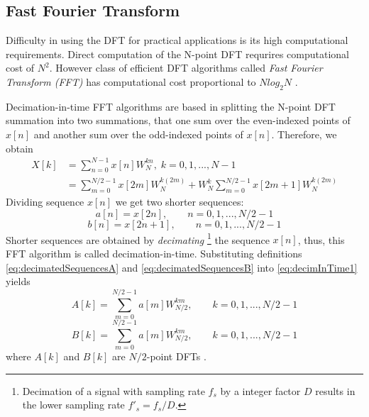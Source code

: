 \documentclass[twoside]{ctuthesis}
\theoremstyle{plain}
\theoremstyle{definition}
\theoremstyle{note}
\begin{document}
\subsection{Fast Fourier Transform}
\label{sec:FFT}
Difficulty in using the DFT for practical applications is its high computational requirements. Direct computation of the N-point DFT requrires computational cost of $N^2$. However class of efficient DFT algorithms called \textit{Fast Fourier Transform (FFT)} has computational cost proportional to $Nlog_{2}N$ \cite{cite:RT_DSP,cite:3}.
\par 
Decimation-in-time FFT algorithms are based in splitting the N-point DFT summation into two summations, that one sum over the even-indexed points of $x[n]$ and another sum over the odd-indexed points of $x[n]$.
Therefore, we obtain
\begin{equation} \label{eq:decimInTime1}
\begin{aligned}
X[k] &= \sum_{n=0}^{N-1}x[n]W^{kn}_{N}, \; k=0,1,...,N-1\\
     &= \sum_{m=0}^{N/2-1}x[2m]W^{k(2m)}_{N} + W^{k}_{N}\sum_{m=0}^{N/2-1}x[2m+1]W^{k(2m)}_{N}
     \end{aligned}
\end{equation}
Dividing sequence $x[n]$ we get two shorter sequences:
\begin{equation} \label{eq:decimatedSequencesA}
a[n]=x[2n],\qquad n=0, 1, ..., N/2 -1
\end{equation}
\begin{equation} \label{eq:decimatedSequencesB}
b[n]=x[2n+1],\qquad n=0, 1, ..., N/2 -1
\end{equation}
Shorter sequences are obtained by \textit{decimating}
\footnote{Decimation of a signal with sampling rate $f_{s}$ by a integer factor $D$ results in the lower sampling rate $f'_{s}=f_{s}/D$.}
 the sequence $x[n]$, thus, this FFT algorithm is called decimation-in-time.
Substituting definitions \ref{eq:decimatedSequencesA} and \ref{eq:decimatedSequencesB} into \ref{eq:decimInTime1} yields
\begin{equation} \label{eq:fft2_A}
A[k]=\sum_{m=0}^{N/2-1}a[m]W^{km}_{N/2},\qquad k=0, 1, ..., N/2 -1
\end{equation}
\begin{equation} \label{eq:fft2_B}
B[k]=\sum_{m=0}^{N/2-1}a[m]W^{km}_{N/2},\qquad k=0, 1, ..., N/2 -1
\end{equation}
where $A[k]$ and $B[k]$ are $N/2$-point DFTs \cite{cite:3,cite:2}.
\end{document}
